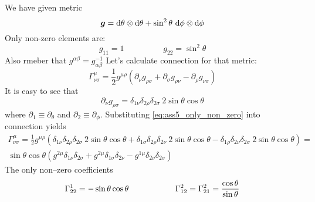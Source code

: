\chapter{}

\problem

\subproblem

We have given metric
%
\begin{equation}
    \boldsymbol{g} = \dd\theta \otimes \dd\theta + \sin^2\theta~\dd\phi \otimes \dd\phi
\end{equation}
%
Only non-zero elements are:
%
\begin{equation}
    g_{11} = 1 \hspace{2cm} g_{22} = \sin^2\theta
\end{equation}
%
Also rmeber that $g^{\alpha\beta} = g_{\alpha\beta}^{-1}$ Let's calculate
connection for that metric:
%
\begin{equation}
    \Gamma^\mu_{\nu\sigma} =
    \frac{1}{2} g^{\mu\rho} \left(
    \partial_\nu g_{\rho\sigma} +
    \partial_\sigma g_{\rho\nu} -
    \partial_\rho g_{\nu\sigma}\right)
\end{equation}
%
It is easy to see that
%
\begin{equation}
    \partial_\nu g_{\rho\sigma} =
    \delta_{1\nu}\delta_{2\rho}\delta_{2\sigma}~2\sin\theta\cos\theta
    \label{eq:ass5_only_non_zero}
\end{equation}
%
where $\partial_1 \equiv \partial_\theta$ and $\partial_2 \equiv \partial_\phi$.
Substituting \cref{eq:ass5_only_non_zero} into connection yields
%
\begin{multline}
    \Gamma^\mu_{\nu\sigma} =
    \frac{1}{2} g^{\mu\rho} \left(
    \delta_{1\nu}\delta_{2\rho}\delta_{2\sigma}~2\sin\theta\cos\theta +
    \delta_{1\sigma}\delta_{2\rho}\delta_{2\nu}~2\sin\theta\cos\theta-
    \delta_{1\rho}\delta_{2\nu}\delta_{2\sigma}~2\sin\theta\cos\theta\right) =\\
    \sin\theta\cos\theta\left(
    g^{2\mu} \delta_{1\nu}\delta_{2\sigma} +
    g^{2\mu} \delta_{1\sigma}\delta_{2\nu} -
    g^{1\mu}\delta_{2\nu}\delta_{2\sigma}\right)
\end{multline}
%
The only non--zero coefficients
%
\begin{equation}
    \Gamma^1_{22} = -\sin\theta\cos\theta
    \hspace*{2cm}
    \Gamma^2_{12} = \Gamma^2_{21} = \frac{\cos\theta}{\sin\theta}
    \label{eq:ass5_coeff}
\end{equation}

\subproblem

